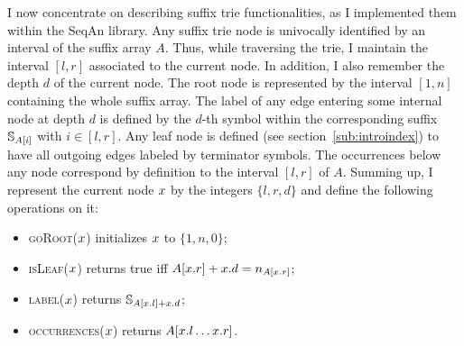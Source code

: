 I now concentrate on describing suffix trie functionalities, as I implemented them within the SeqAn library.
Any suffix trie node is univocally identified by an interval of the suffix array $A$.
Thus, while traversing the trie, I maintain the interval $[l,r]$ associated to the current node.
In addition, I also remember the depth $d$ of the current node.
The root node is represented by the interval $[1,n]$ containing the whole suffix array.
The label of any edge entering some internal node at depth $d$ is defined by the $d$-th symbol within the corresponding suffix $\mathbb {S}_{A[i]}$ with $i \in [l,r]$.
Any leaf node is defined (see section~\ref{sub:introindex}) to have all outgoing edges labeled by terminator symbols.
The occurrences below any node correspond by definition to the interval $[l,r]$ of $A$.
Summing up, I represent the current node $x$ by the integers $\{ l, r ,d \}$ and define the following operations on it:
\begin{itemize}
\item \textsc{goRoot}($x$) initializes $x$ to $\{ 1, n, 0\}$;
\item \textsc{isLeaf}($x$) returns true iff $A[x.r] + x.d = n_{A[x.r]}$;
\item \textsc{label}($x$) returns $\mathbb {S}_{A[x.l] + x.d}$;
\item \textsc{occurrences}($x$) returns $A[x.l \dots x.r]$.
\end{itemize}

